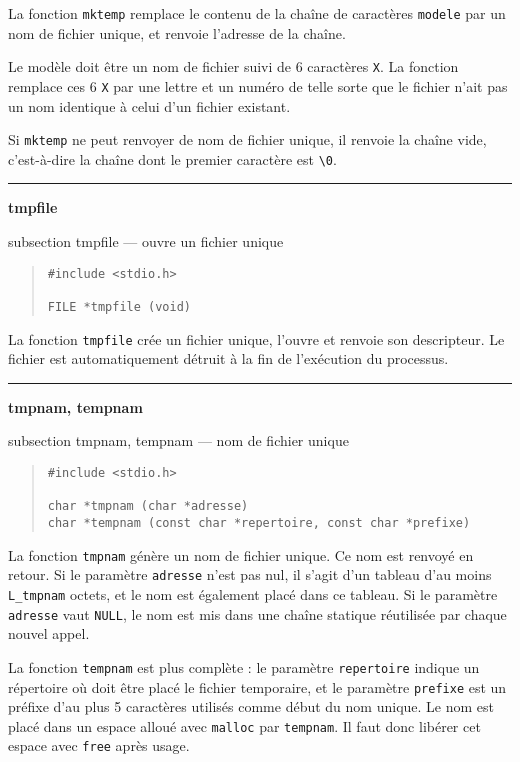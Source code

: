 \documentclass [twoside] {report}
\newcommand {\primitive} [1]
    {
	\phantomsection
	{\large \textbf {#1}}
	\addcontentsline {toc} {subsection} {#1}
    }
\newcommand {\separation}
    {
	\vspace {5mm}
	\nopagebreak
	\hrule
    }
\begin{document}
La fonction \texttt {mktemp} remplace le contenu de la chaîne de
caractères \texttt {modele} par un nom de fichier unique, et
renvoie l'adresse de la chaîne.

Le modèle doit être un nom de fichier suivi de 6 caractères
\texttt {X}. La fonction remplace ces 6 \texttt {X} par une lettre et un
numéro de telle sorte que le fichier n'ait pas un nom
identique à celui d'un fichier existant.

Si \texttt {mktemp} ne peut renvoyer de nom de fichier unique, il
renvoie la chaîne vide, c'est-à-dire la chaîne dont le
premier caractère est \verb:\0:.



\separation 
\primitive {tmpfile} --- ouvre un fichier unique
    \label {tmpfile}

\begin {quote}
\begin {verbatim}
#include <stdio.h>

FILE *tmpfile (void)
\end{verbatim}
\end {quote}

La fonction \texttt {tmpfile} crée un fichier unique, l'ouvre et renvoie son
descripteur. Le fichier est automatiquement détruit à la fin de
l'exécution du processus.


\separation 
\primitive {tmpnam, tempnam} --- nom de fichier unique

\begin {quote}
\begin {verbatim}
#include <stdio.h>

char *tmpnam (char *adresse)
char *tempnam (const char *repertoire, const char *prefixe)
\end{verbatim}
\end {quote}

La fonction \texttt {tmpnam} génère un nom de fichier unique. Ce nom est
renvoyé en retour. Si le paramètre \texttt {adresse} n'est pas nul, il s'agit
d'un tableau d'au moins \texttt {L\_tmpnam} octets, et le nom
est également placé dans ce tableau. Si le paramètre \texttt {adresse} vaut
\texttt{NULL}, le nom est mis dans une chaîne statique réutilisée par chaque
nouvel appel.

La fonction \texttt {tempnam} est plus complète : le paramètre \texttt
{repertoire} indique un répertoire où doit être placé le fichier
temporaire, et le paramètre \texttt {prefixe} est un préfixe d'au plus
5 caractères utilisés comme début du nom unique. Le nom est placé
dans un espace alloué avec \texttt {malloc} par \texttt {tempnam}. Il
faut donc libérer cet espace avec \texttt {free} après usage.
\end{document}
